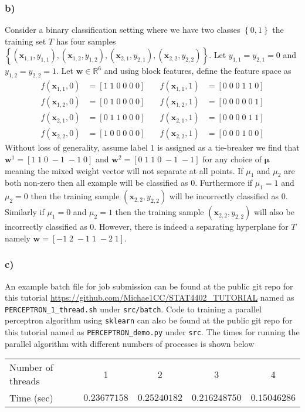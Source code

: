 \subsubsection*{{\bf b)}}
Consider a binary classification setting where we have two classes $\left\{ 0,1 \right\}$ the training set $T$ has four samples $\left\{ \left( \bm{x}_{1,1}, y_{1,1} \right), \left( \bm{x}_{1,2}, y_{1,2} \right), \left( \bm{x}_{2,1}, y_{2,1} \right), \left( \bm{x}_{2,2}, y_{2,2} \right) \right\}$. Let $y_{1,1} = y_{2,1} = 0$ and $y_{1,2} = y_{2,2} = 1$. Let $\bm{w} \in \mathbb{R}^{6}$ and using block features, define the feature space as
\begin{align*}
    f (\bm{x}_{1,1}, 0) &= \left[ 1 \; 1 \; 0 \; 0 \; 0 \; 0 \right] \quad & f (\bm{x}_{1,1}, 1) &= \left[ 0 \; 0 \; 0 \; 1 \; 1 \; 0 \right] \\
    f (\bm{x}_{1,2}, 0) &= \left[ 0 \; 1 \; 0 \; 0 \; 0 \; 0 \right] \quad & f (\bm{x}_{1,2}, 1) &= \left[ 0 \; 0 \; 0 \; 0 \; 0 \; 1 \right] \\
    f (\bm{x}_{2,1}, 0) &= \left[ 0 \; 1 \; 1 \; 0 \; 0 \; 0 \right] \quad & f (\bm{x}_{2,1}, 1) &= \left[ 0 \; 0 \; 0 \; 0 \; 1 \; 1 \right] \\
    f (\bm{x}_{2,2}, 0) &= \left[ 1 \; 0 \; 0 \; 0 \; 0 \; 0 \right] \quad & f (\bm{x}_{2,2}, 1) &= \left[ 0 \; 0 \; 0 \; 1 \; 0 \; 0 \right]
\end{align*}
Without loss of generality, assume label $1$ is assigned as a tie-breaker we find that $\bm{w}^{1} = \left[ 1 \; 1 \; 0 \; -1 \; -1 \; 0 \right]$ and $\bm{w}^{2} = \left[ 0 \; 1 \; 1 \; 0 \; -1 \; -1 \right]$ for any choice of $\bm{\mu}$ meaning the mixed weight vector will not separate at all points. If $\mu_1$ and $\mu_2$ are both non-zero then all example will be classified as $0$. Furthermore if $\mu_1 = 1$ and $\mu_2 = 0$ then the training sample $(\bm{x}_{2,2}, y_{2,2})$ will be incorrectly classified as $0$. Similarly if $\mu_1 = 0$ and $\mu_2 = 1$ then the training sample $(\bm{x}_{2,2}, y_{2,2})$ will also be incorrectly classified as $0$. However, there is indeed a separating hyperplane for $T$ namely $\bm{w} = \left[ -1 \; 2 \; -1 \; 1 \; -2 \; 1 \right]$.

\subsubsection*{{\bf c)}}
An example batch file for job submission can be found at the public git repo for this tutorial \url{https://github.com/Michae1CC/STAT4402_TUTORIAL} named as \texttt{PERCEPTRON\_1\_thread.sh} under \texttt{src/batch}. Code to training a parallel perceptron algorithm using \texttt{sklearn} can also be found at the public git repo for this tutorial named as \texttt{PERCEPTRON\_demo.py} under \texttt{src}. The times for running the parallel algorithm with different numbers of processes is shown below
\begin{table}[h!!!]
\begin{tabular}{l|c|c|c|c}
Number of threads & 1 & 2 & 3 & 4 \\ \cline{2-5} 
Time (sec)        & $0.23677158$ & $0.25240182$ & $0.216248750$ & $0.15046286$
\end{tabular}
\end{table}

